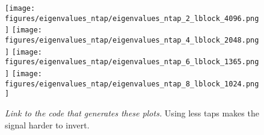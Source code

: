 \documentclass[12pt]{article}
\begin{document}
\begin{figure}[H]
    \centering
    \texttt{[image: figures/eigenvalues\_ntap/eigenvalues\_ntap\_2\_lblock\_4096.png]}
    \texttt{[image: figures/eigenvalues\_ntap/eigenvalues\_ntap\_4\_lblock\_2048.png]}
    \texttt{[image: figures/eigenvalues\_ntap/eigenvalues\_ntap\_6\_lblock\_1365.png]}
    \texttt{[image: figures/eigenvalues\_ntap/eigenvalues\_ntap\_8\_lblock\_1024.png]}
    \caption{\textit{Link to the code that generates these plots.} Using less taps makes the signal harder to invert.}
    \label{fig:my_label}
\end{figure}
\end{document}

